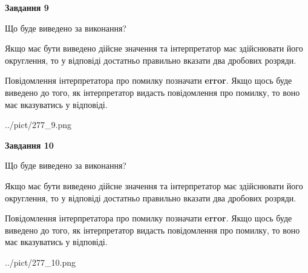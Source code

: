 \documentclass[12pt, ukrainian]{article}
\begin{document}
{\begin {Large}
{\begin {center}\textbf{Завдання 9}\end {center}}\par
Що буде виведено за виконання? \par

Якщо має бути виведено дійсне значення та інтерпретатор має здійснювати його округлення, 
то у відповіді достатньо правильно вказати два дробових розряди.

Повідомлення інтерпретатора про помилку позначати \textbf{error}.
Якщо щось буде виведено до того, як інтерпретатор видасть повідомлення про помилку, 
то воно має вказуватись у відповіді. \par

\begin{center}
	{../pict/277_9.png}
\end{center}
\newpage

{\begin {center}\textbf{Завдання 10}\end {center}}\par
Що буде виведено за виконання? \par

Якщо має бути виведено дійсне значення та інтерпретатор має здійснювати його округлення, 
то у відповіді достатньо правильно вказати два дробових розряди.

Повідомлення інтерпретатора про помилку позначати \textbf{error}.
Якщо щось буде виведено до того, як інтерпретатор видасть повідомлення про помилку, 
то воно має вказуватись у відповіді. \par

\begin{center}
	{../pict/277_10.png}
\end{center}
\newpage

\end {Large}}
\end{document}
